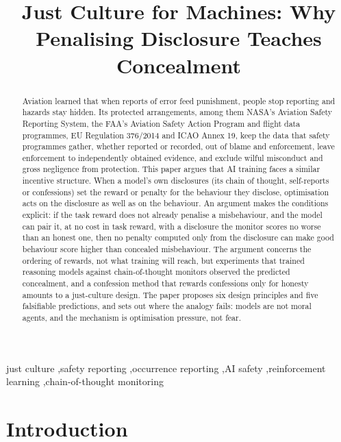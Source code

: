 \documentclass[review,12pt]{elsarticle}
\begin{document}
\begin{frontmatter}
\title{Just Culture for Machines: Why Penalising Disclosure Teaches Concealment}
\begin{abstract}
Aviation learned that when reports of error feed punishment, people stop reporting and hazards stay hidden. Its protected arrangements, among them NASA's Aviation Safety Reporting System, the FAA's Aviation Safety Action Program and flight data programmes, EU Regulation 376/2014 and ICAO Annex 19, keep the data that safety programmes gather, whether reported or recorded, out of blame and enforcement, leave enforcement to independently obtained evidence, and exclude wilful misconduct and gross negligence from protection. This paper argues that AI training faces a similar incentive structure. When a model's own disclosures (its chain of thought, self-reports or confessions) set the reward or penalty for the behaviour they disclose, optimisation acts on the disclosure as well as on the behaviour. An argument makes the conditions explicit: if the task reward does not already penalise a misbehaviour, and the model can pair it, at no cost in task reward, with a disclosure the monitor scores no worse than an honest one, then no penalty computed only from the disclosure can make good behaviour score higher than concealed misbehaviour. The argument concerns the ordering of rewards, not what training will reach, but experiments that trained reasoning models against chain-of-thought monitors observed the predicted concealment, and a confession method that rewards confessions only for honesty amounts to a just-culture design. The paper proposes six design principles and five falsifiable predictions, and sets out where the analogy fails: models are not moral agents, and the mechanism is optimisation pressure, not fear.
\end{abstract}
\begin{keyword}
just culture \sep safety reporting \sep occurrence reporting \sep AI safety \sep reinforcement learning \sep chain-of-thought monitoring
\end{keyword}
\end{frontmatter}
\linenumbers
\setlength{\emergencystretch}{2em}

\section{Introduction}\label{sec:intro}
\end{document}
